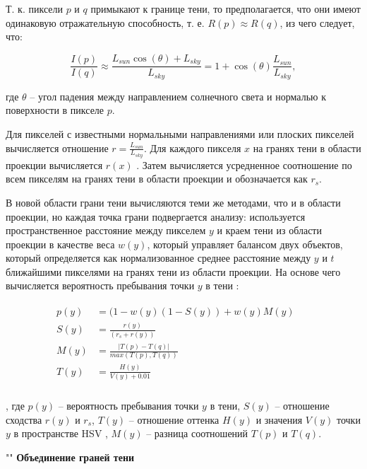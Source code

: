 Т. к. пиксели $p$ и $q$ примыкают к границе тени, то предполагается, что они имеют одинаковую отражательную способность, т. е. $R(p) \approx R(q)$, из чего следует, что:

\begin{equation}
	\frac{I(p)}{I(q)} \approx \frac{L_{sun} \cos(\theta) + L_{sky}}{L_{sky}} = 1 + \cos(\theta)\frac{L_{sun}}{L_{sky}},
\end{equation}

где $\theta$ -- угол падения между направлением солнечного света и нормалью к поверхности в пикселе $p$.

Для пикселей с известными нормальными направлениями или плоских пикселей вычисляется отношение $r = \frac{L_{sun}}{L_{sky}}$. Для каждого пикселя $x$ на гранях тени в области проекции вычисляется $r(x)$ . Затем вычисляется усредненное соотношение по всем пикселям на гранях тени в области проекции и обозначается как $r_s$.

В новой области грани тени вычисляются теми же методами, что и в области проекции, но каждая точка грани подвергается анализу: используется пространственное расстояние между пикселем $y$ и краем тени из области проекции в качестве веса $w(y)$, который управляет балансом двух объектов, который определяется как нормализованное среднее расстояние между $y$ и $t$ ближайшими пикселями на гранях тени из области проекции. На основе чего вычисляется вероятность пребывания точки $y$ в тени \cite{wei2019simulating}:

\begin{equation}
	\begin{aligned}
		\begin{split}
			p(y) &= (1 - w(y)(1 - S(y)) + w(y)M(y) &&\\
			S(y) &= \frac{r(y)}{(r_s + r(y))} &&\\
			M(y) &= \frac{|T(p) - T(q)|}{max(T(p), T(q))} &&\\
			T(y) &= \frac{H(y)}{V(y) + 0.01} &&\\
		\end{split}
	\end{aligned}
\end{equation}

, где $p(y)$ -- вероятность пребывания точки $y$ в тени, $S(y)$ -- отношение сходства $r(y)$ и $r_s$, $T(y)$ -- отношение оттенка $H(y)$ и значения $V(y)$ точки $y$ в пространстве HSV \cite{cheng2001color}, $M(y)$ -- разница соотношений $T(p)$ и $T(q)$.

""\newline
\indent\textbf{Объединение граней тени}

